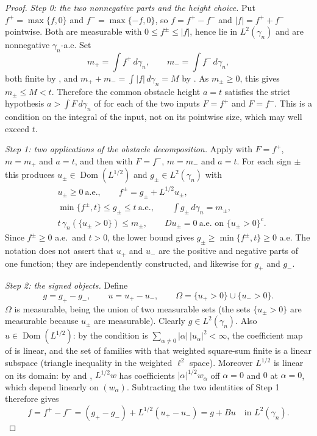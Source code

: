 \begin{proof}
\emph{Step 0: the two nonnegative parts and the height choice.}
Put $f^+ = \max\{f, 0\}$ and $f^- = \max\{-f,0\}$, so $f = f^+ - f^-$ and
$|f| = f^+ + f^-$ pointwise.  Both are measurable with
$0 \leq f^\pm \leq |f|$, hence lie in $L^2(\gamma_n)$ and are nonnegative
$\gamma_n$-a.e.  Set
\[
  m_+ = \int f^+\, d\gamma_n , \qquad m_- = \int f^-\, d\gamma_n ,
\]
both finite by , and $m_+ + m_- = \int |f|\, d\gamma_n = M$ by
.  As $m_\pm \geq 0$, this gives $m_\pm \leq M < t$.  Therefore the
common obstacle height $a = t$ satisfies the strict hypothesis
$a > \int F\, d\gamma_n$ of  for each of the two
inputs $F = f^+$ and $F = f^-$.  This is a condition on the integral of the input,
not on its pointwise size, which may well exceed $t$.

\emph{Step 1: two applications of the obstacle decomposition.}
Apply  with $F = f^+$, $m = m_+$ and $a = t$, and
then with $F = f^-$, $m = m_-$ and $a = t$.  For each sign $\pm$ this produces
$u_\pm \in \operatorname{Dom}(L^{1/2})$ and $g_\pm \in L^2(\gamma_n)$ with
\begin{align*}
  &u_\pm \geq 0 \ \text{a.e.}, \qquad f^\pm = g_\pm + L^{1/2}u_\pm ,\\
  &\min\{f^\pm, t\} \leq g_\pm \leq t \ \text{a.e.}, \qquad
   \int g_\pm \, d\gamma_n = m_\pm ,\\
  &t\,\gamma_n(\{u_\pm > 0\}) \leq m_\pm , \qquad
   Du_\pm = 0 \ \text{a.e. on } \{u_\pm > 0\}^c .
\end{align*}
Since $f^\pm \geq 0$ a.e.\ and $t > 0$, the lower bound gives
$g_\pm \geq \min\{f^\pm, t\} \geq 0$ a.e.  The notation does not assert that
$u_+$ and $u_-$ are the positive and negative parts of one function; they are
independently constructed, and likewise for $g_+$ and $g_-$.

\emph{Step 2: the signed objects.}
Define
\[
  g = g_+ - g_-, \qquad u = u_+ - u_-,
  \qquad \Omega = \{u_+>0\} \cup \{u_->0\} .
\]
$\Omega$ is measurable, being the union of two measurable sets (the sets
$\{u_\pm>0\}$ are measurable because $u_\pm$ are measurable).  Clearly
$g \in L^2(\gamma_n)$.  Also $u \in \operatorname{Dom}(L^{1/2})$: by
 the condition is
$\sum_{\alpha\neq0}|\alpha|\,|u_\alpha|^2 < \infty$, the coefficient map of
 is linear, and the set of families with that weighted
square-sum finite is a linear subspace (triangle inequality in the weighted
$\ell^2$ space).  Moreover $L^{1/2}$ is linear on its domain: by
 and , $L^{1/2}w$ has coefficients
$|\alpha|^{1/2}w_\alpha$ off $\alpha = 0$ and $0$ at $\alpha = 0$, which depend
linearly on $(w_\alpha)$.  Subtracting the two identities of Step 1 therefore
gives
\[
  f = f^+ - f^- = (g_+ - g_-) + L^{1/2}(u_+ - u_-) = g + Bu
  \quad\text{in } L^2(\gamma_n).
\]


\end{proof}

